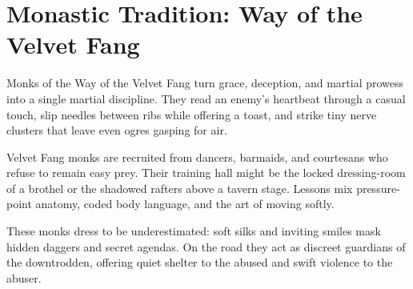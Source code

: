 \documentclass[letterpaper,twocolumn,openany,nodeprecatedcode,bg=full]{dndbook}
\begin{document}
\section*{Monastic Tradition: Way of the Velvet Fang}
Monks of the Way of the Velvet Fang turn grace, deception, and martial prowess into a single martial discipline. They read an enemy’s heartbeat through a casual touch, slip needles between ribs while offering a toast, and strike tiny nerve clusters that leave even ogres gasping for air.

Velvet Fang monks are recruited from dancers, barmaids, and courtesans who refuse to remain easy prey. Their training hall might be the locked dressing-room of a brothel or the shadowed rafters above a tavern stage. Lessons mix pressure-point anatomy, coded body language, and the art of moving softly.

These monks dress to be underestimated: soft silks and inviting smiles mask hidden daggers and secret agendas. On the road they act as discreet guardians of the downtrodden, offering quiet shelter to the abused and swift violence to the abuser.
\end{document}
